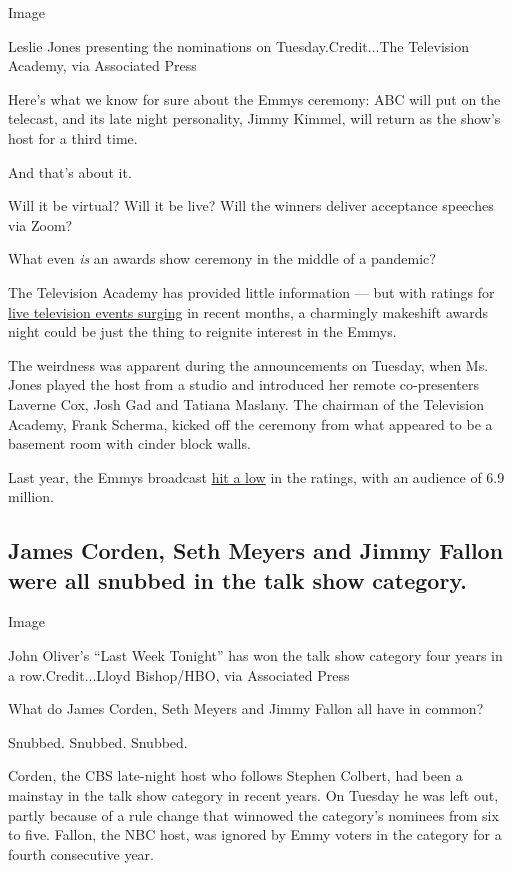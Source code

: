 Image

Leslie Jones presenting the nominations on Tuesday.Credit...The
Television Academy, via Associated Press

Here's what we know for sure about the Emmys ceremony: ABC will put on
the telecast, and its late night personality, Jimmy Kimmel, will return
as the show's host for a third time.

And that's about it.

Will it be virtual? Will it be live? Will the winners deliver acceptance
speeches via Zoom?

What even \emph{is} an awards show ceremony in the middle of a pandemic?

The Television Academy has provided little information --- but with
ratings for
\href{https://www.espn.com/mlb/story/_/id/29532370/mlb-opener-was-most-viewed-regular-season-game-2011}{live
television events surging} in recent months, a charmingly makeshift
awards night could be just the thing to reignite interest in the Emmys.

The weirdness was apparent during the announcements on Tuesday, when Ms.
Jones played the host from a studio and introduced her remote
co-presenters Laverne Cox, Josh Gad and Tatiana Maslany. The chairman of
the Television Academy, Frank Scherma, kicked off the ceremony from what
appeared to be a basement room with cinder block walls.

Last year, the Emmys broadcast
\href{https://www.nytimes3xbfgragh.onion/2019/09/23/business/media/emmy-ratings.html}{hit
a low} in the ratings, with an audience of 6.9 million.

\hypertarget{james-corden-seth-meyers-and-jimmy-fallon-were-all-snubbed-in-the-talk-show-category}{%
\subsection{James Corden, Seth Meyers and Jimmy Fallon were all snubbed
in the talk show
category.}\label{james-corden-seth-meyers-and-jimmy-fallon-were-all-snubbed-in-the-talk-show-category}}

Image

John Oliver's ``Last Week Tonight'' has won the talk show category four
years in a row.Credit...Lloyd Bishop/HBO, via Associated Press

What do James Corden, Seth Meyers and Jimmy Fallon all have in common?

Snubbed. Snubbed. Snubbed.

Corden, the CBS late-night host who follows Stephen Colbert, had been a
mainstay in the talk show category in recent years. On Tuesday he was
left out, partly because of a rule change that winnowed the category's
nominees from six to five. Fallon, the NBC host, was ignored by Emmy
voters in the category for a fourth consecutive year.

